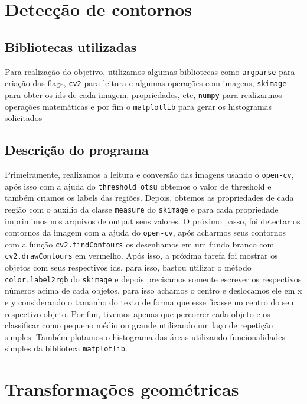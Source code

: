\documentclass{article}
\begin{document}
    \section{Detecção de contornos}\label{sec:deteccao-de-contornos}

    \subsection{Bibliotecas utilizadas}\label{subsec:bibliotecas-utilizadas}
    Para realização do objetivo, utilizamos algumas bibliotecas como \texttt{argparse} para criação das flags,
    \texttt{cv2} para leitura e algumas operações com imagens, \texttt{skimage} para obter os ids de cada imagem, propriedades, etc,
    \texttt{numpy} para realizarmos operações matemáticas e por fim o \texttt{matplotlib} para gerar os histogramas solicitados

    \subsection{Descrição do programa}\label{subsec:descricao-do-programa}
    Primeiramente, realizamos a leitura e conversão das imagens usando o \texttt{open-cv}, após isso com a ajuda do
    \texttt{threshold\_otsu} obtemos o valor de threshold e também criamos os labels das regiões.
    Depois, obtemos as propriedades de cada região com o auxílio da classe \texttt{measure} do \texttt{skimage} e para
    cada propriedade imprimimos nos arquivos de output seus valores.
    O próximo passo, foi detectar os contornos da imagem com a ajuda do \texttt{open-cv}, após acharmos seus contornos
    com a função \texttt{cv2.findContours} os desenhamos em um fundo branco com \texttt{cv2.drawContours} em vermelho.
    Após isso, a próxima tarefa foi mostrar os objetos com seus respectivos ids, para isso, bastou utilizar o método
    \texttt{color.label2rgb} do \texttt{skimage} e depois precisamos somente escrever os respectivos números acima de cada objetos,
    para isso achamos o centro e deslocamos ele em x e y considerando o tamanho do texto de forma que esse ficasse no centro
    do seu respectivo objeto.
    Por fim, tivemos apenas que percorrer cada objeto e os classificar como pequeno médio ou grande utilizando um laço de repetição simples.
    Também plotamos o histograma das áreas utilizando funcionalidades simples da biblioteca \texttt{matplotlib}.


    \section{Transformações geométricas}\label{sec:transformacoes-geometricas}
\end{document}
